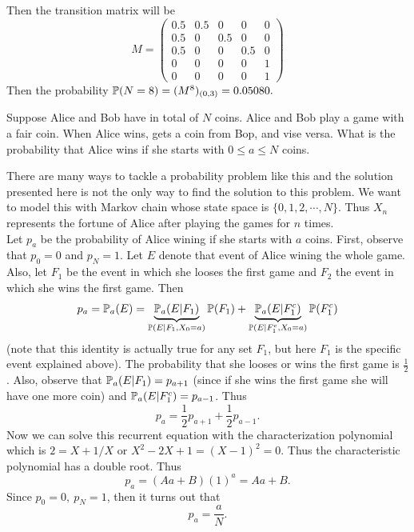 \begin{solution}
\begin{center}
\begin{tikzpicture}[->,>=stealth',shorten >=1pt,auto,node distance=2cm,
			semithick,scale=0.7]
			
		\end{tikzpicture}
	\end{center}
	Then the transition matrix will be
	\[
	M = \begin{pmatrix}
		0.5 & 0.5 & 0 & 0 & 0 \\
		0.5 & 0 & 0.5 & 0 & 0 \\
		0.5 & 0 & 0 & 0.5 & 0 \\
		0 & 0 & 0 & 0 & 1 \\
		0 & 0 & 0 & 0 & 1
	\end{pmatrix}
	\]
	Then the probability $\prob(N=8) = (M^8)_{(0,3)} = 0.05080.$
\end{solution}


\begin{problem}
	Suppose Alice and Bob have in total of $N$ coins. Alice and Bob play a game with a fair coin. When Alice wins, gets a coin from Bop, and vise versa. What is the probability that Alice wins if she starts with $0\leq a \leq N$ coins.
\end{problem}
\begin{solution}
	There are many ways to tackle a probability problem like this and the solution presented here is not the only way to find the solution to this problem. We want to model this with Markov chain whose state space is $\{0,1,2,\cdots,N\}$. Thus $X_n$ represents the fortune of Alice after playing the games for $n$ times. 
	 \\
	Let $p_a$ be the probability of Alice wining if she starts with $a$ coins. First, observe that $p_0 = 0$ and $p_N= 1$. Let $E$ denote that event of Alice wining the whole game. Also, let $F_1$ be the event in which she looses the first game and $F_2$ the event in which she wins the first game. Then
	\[ p_a = \prob_a(E) =  \underbrace{\prob_a(E | F_1)}_{\prob(E|F_1,X_0=a)} \prob(F_1) + \underbrace{\prob_a(E|F_1^c)}_{\prob(E|F_1^c,X_0=a)}\prob(F_1^c) \]
	(note that this identity is actually true for any set $F_1$, but here $F_1$ is the specific event explained above). The probability that she looses or wins the first game is $\frac{1}{2}$. Also, observe that $\prob_a(E|F_1) = p_{a+1}$ (since if she wins the first game she will have one more coin) and $\prob_a(E|F_1^c) = p_{a-1}$. Thus 
	\[ p_a = \frac{1}{2}p_{a+1} + \frac{1}{2}p_{a-1}. \]
	Now we can solve this recurrent equation with the characterization polynomial which is $2 = X + 1/X$ or $X^2 - 2X + 1 = (X-1)^2 = 0$. Thus the characteristic polynomial has a double root. Thus 
	\[ p_a = (Aa + B)(1)^a = Aa + B. \]
	Since $p_0 = 0,\ p_N =1$, then it turns out that
	\[ p_a = \frac{a}{N}. \]
\end{solution}

